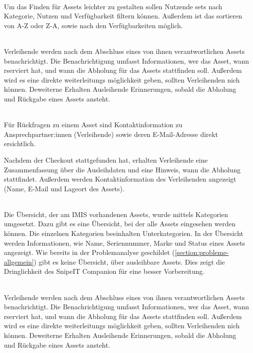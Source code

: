     {\sffamily\color{maincolor}{Ft-A-2 | Filtern und Sortieren }}\\
Um das Finden für Assets leichter zu gestalten sollen Nutzende sets nach
Kategorie, Nutzen und Verfügbarkeit filtern können. Außerdem ist das sortieren
von A-Z oder Z-A, sowie nach den Verfügbarkeiten möglich.



{\sffamily\color{maincolor}{Ft-VA-2 | Benachrichtigungen \& Erinnerungen
}}\\
Verleihende werden nach dem Abschluss eines von ihnen verantwortlichen Assets
benachrichtigt. Die Benachrichtigung umfasst Informationen, wer das Asset, wann
rserviert hat, und wann die Abholung für das Assets stattfinden soll. Außerdem
wird es eine direkte weiterleitungs möglichkeit geben, sollten Verleihenden nich
können. Deweiterne Erhalten Ausleihende Erinnerungen, sobald die Abholung und
Rückgabe eines Assets ansteht.

    {\sffamily\color{maincolor}{Ft-VA-3 | Sichtbarkeit von
            Ansprechpartner:innen}}\\
Für Rückfragen zu einem Asset sind Kontaktinformation zu Ansprechpartner:innen
(Verleihende) sowie deren E-Mail-Adresse direkt ersichtlich.

Nachdem der Checkout stattgefunden hat, erhalten Verleihende eine
Zusammenfassung über die Ausleihdaten und eine  Hinweis, wann die Abholung
stattfindet. Außerdem werden Kontaktinformation des Verleihenden angezeigt
(Name, E-Mail und Lageort des Assets).

    {\sffamily\color{maincolor}{Ft-VA-1 | Übersicht über ausleihbare Assets }}\\
Die Übersicht, der am IMIS vorhandenen Assets, wurde mittels Kategorien
umgesetzt. Dazu gibt es eine Übersicht, bei der alle Assets eingesehen werden
können. Die einzelnen Kategorien beeinhalten Unterkategorien. In der Übersicht
werden Informationen, wie Name, Seriennummer, Marke und Status eines Assets
angezeigt. Wie bereits in der Problemanalyse geschildet
(\ref{section:probleme-allgemein}) gibt es keine Übersicht, über ausleihbare
Assets. Dies zeigt die Dringlichkeit des SnipeIT Companion für eine besser
Vorbereitung.

    {\sffamily\color{maincolor}{Ft-VA-2 | Benachrichtigungen \& Erinnerungen
        }}\\
Verleihende werden nach dem Abschluss eines von ihnen verantwortlichen Assets
benachrichtigt. Die Benachrichtigung umfasst Informationen, wer das Asset, wann
rserviert hat, und wann die Abholung für das Assets stattfinden soll. Außerdem
wird es eine direkte weiterleitungs möglichkeit geben, sollten Verleihenden nich
können. Deweiterne Erhalten Ausleihende Erinnerungen, sobald die Abholung und
Rückgabe eines Assets ansteht.

